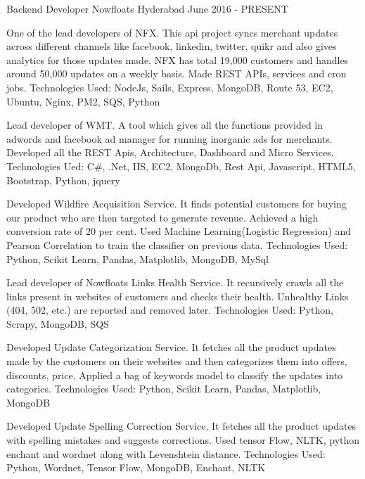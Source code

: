 
\begin{cventries}

  \cventry
    {Backend Developer} %
    {Nowfloats} %
    {Hyderabad} %
    {June 2016 - PRESENT} %
    {
      \begin{cvitems} %
        \item {One of the lead developers of NFX. This api project syncs merchant updates across different channels like facebook, linkedin, twitter, quikr and also gives analytics for those updates made. NFX has total 19,000 customers and handles around 50,000 updates on a weekly basis. Made REST APIs, services and cron jobs. Technologies Used: NodeJs, Sails, Express, MongoDB, Route 53, EC2, Ubuntu, Nginx, PM2, SQS, Python}
        \item {Lead developer of WMT. A tool which gives all the functions provided in adwords and facebook ad manager for running inorganic ads for merchants. Developed all the REST Apis, Architecture, Dashboard and Micro Services. Technologies Ued: C\#, .Net, IIS, EC2, MongoDb, Rest Api, Javascript, HTML5, Bootstrap, Python, jquery}
        \item {Developed Wildfire Acquisition Service. It finds potential customers for buying our product who are then targeted to generate revenue. Achieved a high conversion rate of 20 per cent. Used Machine Learning(Logistic Regression) and Pearson Correlation to train the classifier on previous data. Technologies Used: Python, Scikit Learn, Pandas, Matplotlib, MongoDB, MySql  }
        \item {Lead developer of Nowfloats Links Health Service. It recursively crawls all the links present in websites of customers and checks their health. Unhealthy Links (404, 502, etc.) are reported and removed later. Technologies Used: Python, Scrapy, MongoDB, SQS  }
        \item {Developed Update Categorization Service. It fetches all the product updates made by the customers on their websites and then categorizes them into offers, discounts, price. Applied a bag of keywords model to classify the updates into categories. Technologies Used: Python, Scikit Learn, Pandas, Matplotlib, MongoDB  }
        \item {Developed Update Spelling Correction Service. It fetches all the product updates with spelling mistakes and suggests corrections. Used tensor Flow, NLTK, python enchant and wordnet along with Levenshtein distance. Technologies Used: Python, Wordnet, Tensor Flow, MongoDB, Enchant, NLTK  }
      \end{cvitems}
    }


\end{cventries}
